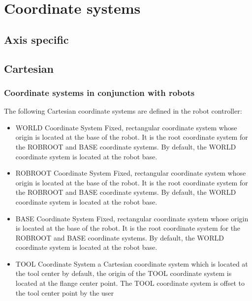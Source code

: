 \documentclass[a4paper]{report}
\begin{document}
	
\tableofcontents		
		
\section{Coordinate systems}
\subsection{Axis specific}

\subsection{Cartesian}
\subsubsection{Coordinate systems in conjunction with robots}
The following Cartesian coordinate systems are defined in the robot controller:
\begin{itemize}
	\item WORLD Coordinate System
	\newline
	Fixed, rectangular coordinate system whose origin is located at the base of the robot. It is the root coordinate system for the ROBROOT and BASE coordinate systems.
	By default, the WORLD coordinate system is located at the robot base.
	\item ROBROOT Coordinate System
	\newline
	Fixed, rectangular coordinate system whose origin is located at the base of the robot. It is the root coordinate system for the ROBROOT and BASE coordinate systems.
	By default, the WORLD coordinate system is located at the robot base.
	\item BASE Coordinate System
	Fixed, rectangular coordinate system whose origin is located at the base of the robot. It is the root coordinate system for the ROBROOT and BASE coordinate systems.
	By default, the WORLD coordinate system is located at the robot base.
	\item TOOL Coordinate System
	\newline
	a Cartesian coordinate system which is located at the tool center by default, the origin of the TOOL coordinate system is located at the flange center point. The TOOL coordinate system is offset to the tool center point by the user

\end{itemize}
\end{document}
